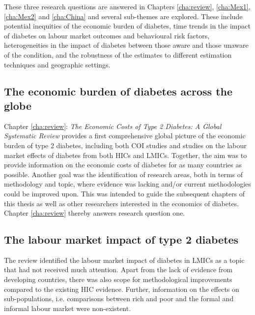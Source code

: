These three research questions are answered in Chapters \ref{cha:review}, \ref{cha:Mex1}, \ref{cha:Mex2} and \ref{cha:China} and several sub-themes are explored. These include potential inequities of the economic burden of diabetes, time trends in the impact of diabetes on labour market outcomes and behavioural risk factors, heterogeneities in the impact of diabetes between those aware and those unaware of the condition, and the robustness of the estimates to different estimation techniques and geographic settings.


\subsection{The economic burden of diabetes across the globe}

Chapter \ref{cha:review}: \textit{The Economic Costs of Type 2 Diabetes: A Global Systematic Review} provides a first comprehensive global picture of the economic burden of type 2 diabetes, including both \ac{COI} studies and studies on the labour market effects of diabetes from both \acp{HIC} and \acp{LMIC}. Together, the aim was to provide information on the economic costs of diabetes for as many countries as possible. Another goal was the identification of research areas, both in terms of methodology and topic, where evidence was lacking and/or current methodologies could be improved upon. This was intended to guide the subsequent chapters of this thesis as well as other researchers interested in the economics of diabetes. Chapter \ref{cha:review} thereby answers research question one.

\subsection{The labour market impact of type 2 diabetes}

The review identified the labour market impact of diabetes in \acp{LMIC} as a topic that had not received much attention. Apart from the lack of evidence from developing countries, there was also scope for methodological improvements compared to the existing \ac{HIC} evidence. Further, information on the effects on sub-populations, i.e. comparisons between rich and poor and the formal and informal labour market were non-existent.

